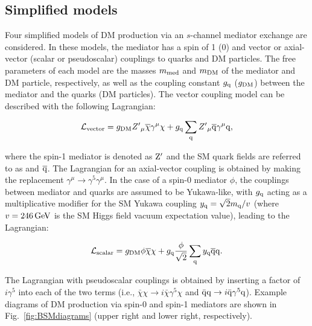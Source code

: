 \subsection{Simplified models}
Four simplified models of DM production via an $s$-channel mediator exchange are considered.
In these models, the mediator has a spin of 1 (0) and vector or axial-vector (scalar or pseudoscalar) couplings to quarks and DM particles.
The free parameters of each model are the masses $m_{\rm med}$ and $m_{\rm DM}$ of the mediator and DM particle, respectively, as well as the coupling
constant $g_{\mathrm{q}}$ ($g_{\rm DM}$) between the mediator and the quarks (DM particles).
The vector coupling model can be described with the following Lagrangian:

\begin{equation*}
\mathcal{L}_{\text{vector}} = g_{\rm DM} {Z'}_{\mu}\overline{\chi}\gamma^{\mu}\chi  + g_{\mathrm{q}} \sum_{\mathrm{q}} {Z'}_{\mu} \overline{\mathrm{q}}\gamma^{\mu}\mathrm{q},
\end{equation*}

\noindent where the spin-1 mediator is denoted as $\mathrm{Z}'$ and the SM quark fields are referred to as \PQq and $\overline{\mathrm{q}}$.
The Lagrangian for an axial-vector coupling is obtained by making the replacement $\gamma^\mu\rightarrow\gamma^5\gamma^\mu$.
In the case of a spin-0 mediator $\phi$, the couplings between mediator and quarks are assumed to be Yukawa-like, with $g_{\mathrm{q}}$ acting as a 
multiplicative modifier for the SM Yukawa coupling ${y_{\mathrm{q}} = \sqrt{2}m_{\mathrm{q}}/v}$ (where $v = 246 \,\text{Ge\hspace{-.08em}V}$ is the SM Higgs field vacuum expectation value),
leading to the Lagrangian:

\begin{equation*}
\mathcal{L}_{\text{scalar}} = g_{\rm DM} {\phi}\overline{\chi}\chi  + g_{\mathrm{q}} \frac{\phi}{\sqrt{2}}\sum_{\mathrm{q}} y_{\mathrm{q}} \overline{\mathrm{q}}\mathrm{q}.
\end{equation*}

\noindent The Lagrangian with pseudoscalar couplings is obtained by inserting a factor of $i\gamma^5$ into each of the two terms (i.e., $\bar\chi\chi \to i\bar\chi\gamma^5\chi$ and $\bar {\mathrm{q}} \mathrm{q} \to i\bar {\mathrm{q}}\gamma^5 \mathrm{q}$). Example diagrams of DM production via spin-0 and spin-1 mediators are shown in Fig.~\ref{fig:BSMdiagrams} (upper right and lower right, respectively).


